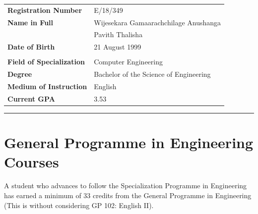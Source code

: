 \documentclass[12pt]{article}
\begin{document}
\begin{table}[H]
\begin{tabularx}{\textwidth}{Xl}
\textbf{Registration Number} & E/18/349 \\
\textbf{Name in Full} & Wijesekara Gamaarachchilage Anushanga \\
\textbf{ } & Pavith Thalisha  \\
\textbf{Date of Birth} & 21 August 1999 \\
\\

\textbf{Field of Specialization} & Computer Engineering \\
\textbf{Degree} & Bachelor of the Science of Engineering \\
\textbf{Medium of Instruction} & English \\
\textbf{Current GPA} & 3.53 \\
\end{tabularx}
\end{table}

\vspace{-15pt}

\noindent\rule{\textwidth}{1pt}

\vspace{-20pt}

\section*{General Programme in Engineering Courses}

A student who advances to follow the Specialization Programme in Engineering has earned a minimum of 33 credits from the General Programme in Engineering (This is without considering GP 102: English II).
\end{document}
